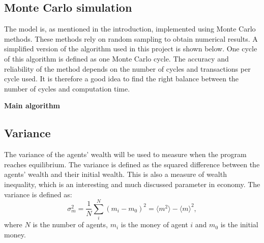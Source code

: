 \documentclass[11pt,a4paper,titlepage]{article}
\begin{document}
\subsection{Monte Carlo simulation}
The model is, as mentioned in the introduction, implemented using Monte Carlo methods. These methods rely on random sampling to obtain numerical results. A simplified version of the algorithm used in this project is shown below. One cycle of this algorithm is defined as one Monte Carlo cycle.  The accuracy and reliability of the method depends on the number of cycles and transactions per cycle used. It is therefore a good idea to find the right balance between the number of cycles and computation time. 
\bigbreak
\begin{center}
\textbf{Main algorithm}

\end{center}


\subsection{Variance}
The variance of the agents' wealth will be used to measure when the program reaches equilibrium. The variance is defined as the squared difference between the agents' wealth and their initial wealth. This is also a measure of wealth inequality, which is an interesting and much discussed parameter in economy. The variance is defined as:
\begin{equation}
\label{eq:variance}
\sigma_{m}^{2} = \frac{1}{N}\sum_i^{N}(m_{i}-m_{0})^2 = \langle m^{2} \rangle - \langle m \rangle^{2},
\end{equation}
where $N$ is the number of agents, $m_i$ is the money of agent $i$ and $m_0$ is the initial money. 
\end{document}

